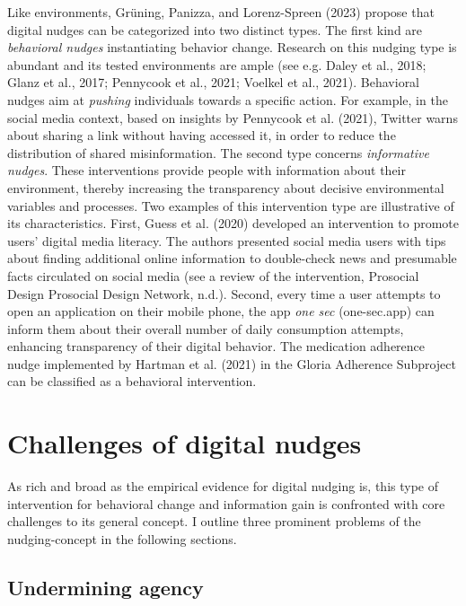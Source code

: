 \documentclass[reflection, authordate,issue]{jote-new-article}
\begin{document}
Like environments, Grüning, Panizza, and
Lorenz-Spreen (2023) propose that digital nudges can be categorized into two distinct types. The first kind are \emph{behavioral nudges} instantiating behavior change. Research on this nudging type is abundant and its tested environments are ample (see e.g. Daley et al., 2018; Glanz et al., 2017; Pennycook et al., 2021; Voelkel et al., 2021). Behavioral nudges aim at \emph{pushing }individuals towards a specific action. For example, in the social media context, based on insights by Pennycook et al. (2021), Twitter warns about sharing a link without having accessed it, in order to reduce the distribution of shared misinformation. The second type concerns \emph{informative nudges}. These interventions provide people with information about their environment, thereby increasing the transparency about decisive environmental variables and processes. Two examples of this intervention type are illustrative of its characteristics. First, Guess et al. (2020)  developed an intervention to promote users’ digital media literacy. The authors presented social media users with tips about finding additional online information to double-check news and presumable facts circulated on social media (see a review of the intervention, Prosocial Design Prosocial Design Network, n.d.). Second, every time a user attempts to open an application on their mobile phone, the app \emph{one sec }(one-sec.app) can inform them about their overall number of daily consumption attempts, enhancing transparency of their digital behavior. The medication adherence nudge implemented by Hartman et al. (2021) in the Gloria Adherence Subproject can be classified as a behavioral intervention.



\section{Challenges of digital nudges}



As rich and broad as the empirical evidence for digital nudging is, this type of intervention for behavioral change and information gain is confronted with core challenges to its general concept. I outline three prominent problems of the nudging-concept in the following sections.



\subsection{Undermining agency}
\end{document}
